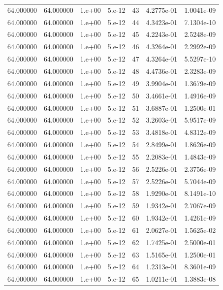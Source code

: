 \begin{table}[htbp]
\begin{tabular}{rrrrrrr}
64.000000 & 64.000000 & 1.e+00 & 5.e-12 & 43 & 4.2775e-01 & 1.0041e-09 \\
64.000000 & 64.000000 & 1.e+00 & 5.e-12 & 44 & 4.3423e-01 & 7.1304e-10 \\
64.000000 & 64.000000 & 1.e+00 & 5.e-12 & 45 & 4.2243e-01 & 2.5248e-09 \\
64.000000 & 64.000000 & 1.e+00 & 5.e-12 & 46 & 4.3264e-01 & 2.2992e-09 \\
64.000000 & 64.000000 & 1.e+00 & 5.e-12 & 47 & 4.3264e-01 & 5.5297e-10 \\
64.000000 & 64.000000 & 1.e+00 & 5.e-12 & 48 & 4.4736e-01 & 2.3283e-09 \\
64.000000 & 64.000000 & 1.e+00 & 5.e-12 & 49 & 3.9904e-01 & 1.3679e-09 \\
64.000000 & 64.000000 & 1.e+00 & 5.e-12 & 50 & 3.4661e-01 & 1.4916e-09 \\
64.000000 & 64.000000 & 1.e+00 & 5.e-12 & 51 & 3.6887e-01 & 1.2500e-01 \\
64.000000 & 64.000000 & 1.e+00 & 5.e-12 & 52 & 3.2603e-01 & 5.9517e-09 \\
64.000000 & 64.000000 & 1.e+00 & 5.e-12 & 53 & 3.4818e-01 & 4.8312e-09 \\
64.000000 & 64.000000 & 1.e+00 & 5.e-12 & 54 & 2.8499e-01 & 1.8626e-09 \\
64.000000 & 64.000000 & 1.e+00 & 5.e-12 & 55 & 2.2083e-01 & 1.4843e-09 \\
64.000000 & 64.000000 & 1.e+00 & 5.e-12 & 56 & 2.5226e-01 & 2.3756e-09 \\
64.000000 & 64.000000 & 1.e+00 & 5.e-12 & 57 & 2.5226e-01 & 5.7044e-09 \\
64.000000 & 64.000000 & 1.e+00 & 5.e-12 & 58 & 1.9290e-01 & 8.1491e-10 \\
64.000000 & 64.000000 & 1.e+00 & 5.e-12 & 59 & 1.9342e-01 & 2.7067e-09 \\
64.000000 & 64.000000 & 1.e+00 & 5.e-12 & 60 & 1.9342e-01 & 1.4261e-09 \\
64.000000 & 64.000000 & 1.e+00 & 5.e-12 & 61 & 2.0627e-01 & 1.5625e-02 \\
64.000000 & 64.000000 & 1.e+00 & 5.e-12 & 62 & 1.7425e-01 & 2.5000e-01 \\
64.000000 & 64.000000 & 1.e+00 & 5.e-12 & 63 & 1.5165e-01 & 1.2500e-01 \\
64.000000 & 64.000000 & 1.e+00 & 5.e-12 & 64 & 1.2313e-01 & 8.3601e-09 \\
64.000000 & 64.000000 & 1.e+00 & 5.e-12 & 65 & 1.0211e-01 & 1.3883e-08 \\

\end{tabular}
\end{table}
